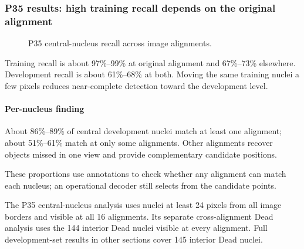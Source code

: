 \documentclass[
  12pt,
]{article}
\begin{document}
\subsubsection{P35 results: high training recall depends on the original alignment}\label{chapter17}
\begin{figure}[H]\centering\caption{P35 central-nucleus recall across image alignments.}\end{figure}
Training recall is about 97\%–99\% at original alignment and 67\%–73\% elsewhere. Development recall is about 61\%–68\% at both. Moving the same training nuclei a few pixels reduces near-complete detection toward the development level.

\paragraph{Per-nucleus finding}
About 86\%–89\% of central development nuclei match at least one alignment; about 51\%–61\% match at only some alignments. Other alignments recover objects missed in one view and provide complementary candidate positions.

These proportions use annotations to check whether any alignment can match each nucleus; an operational decoder still selects from the candidate points.

The P35 central-nucleus analysis uses nuclei at least 24 pixels from all image borders and visible at all 16 alignments. Its separate cross-alignment Dead analysis uses the 144 interior Dead nuclei visible at every alignment. Full development-set results in other sections cover 145 interior Dead nuclei.
\end{document}

